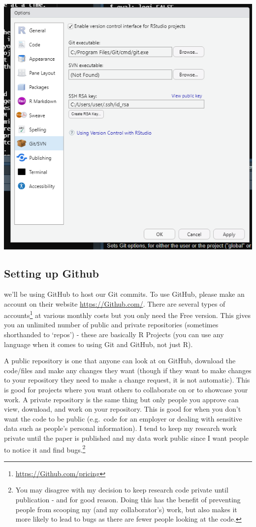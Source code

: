 \documentclass[
]{krantz}
\renewcommand{\href}[2]{#2\footnote{\url{#1}}}
\begin{document}
\includegraphics{images/git_tools.PNG}

\hypertarget{setting-up-github}{%
\subsection{Setting up Github}\label{setting-up-github}}

we'll be using GitHub to host our Git commits. To use GitHub, please make an account on their website \url{https://Github.com/}. There are several \href{https://Github.com/pricing}{types of accounts} at various monthly costs but you only need the Free version. This gives you an unlimited number of public and private repositories (sometimes shorthanded to `repos') - these are basically R Projects (you can use any language when it comes to using Git and GitHub, not just R).

A public repository is one that anyone can look at on GitHub, download the code/files and make any changes they want (though if they want to make changes to your repository they need to make a change request, it is not automatic). This is good for projects where you want others to collaborate on or to showcase your work. A private repository is the same thing but only people you approve can view, download, and work on your repository. This is good for when you don't want the code to be public (e.g.~code for an employer or dealing with sensitive data such as people's personal information). I tend to keep my research work private until the paper is published and my data work public since I want people to notice it and find bugs.\footnote{You may disagree with my decision to keep research code private until publication - and for good reason. Doing this has the benefit of preventing people from scooping my (and my collaborator's) work, but also makes it more likely to lead to bugs as there are fewer people looking at the code.}
\end{document}
